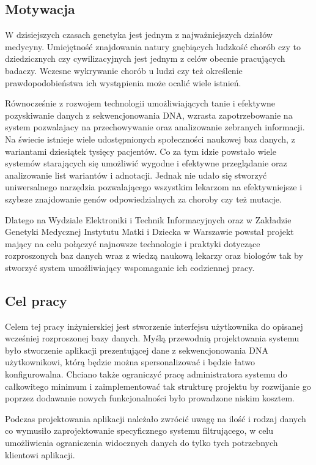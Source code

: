 \documentclass[a4paper,12pt,twoside]{article}
\begin{document}
\subsection{Motywacja}
W dzisiejszych czasach genetyka jest jednym z najważniejszych działów medycyny.
Umiejętność znajdowania natury gnębiących ludzkość chorób
czy to dziedzicznych czy cywilizacyjnych jest jednym z celów obecnie pracujących badaczy. Wczesne wykrywanie chorób u ludzi czy też określenie prawdopodobieństwa 
ich wystąpienia może ocalić wiele istnień. 

Równocześnie z rozwojem technologii umożliwiających tanie i efektywne
pozyskiwanie danych z sekwencjonowania DNA, wzrasta zapotrzebowanie 
na system pozwalajacy na przechowywanie oraz analizowanie zebranych
informacji.
Na świecie istnieje wiele udostępnionych społeczności naukowej baz danych,
z wariantami dziesiątek tysięcy pacjentów. Co za tym idzie powstało 
wiele systemów starających się umożliwić wygodne i efektywne 
przeglądanie oraz analizowanie list wariantów i adnotacji.
Jednak nie udało się stworzyć uniwersalnego narzędzia pozwalającego
wszystkim lekarzom na efektywniejsze i szybsze znajdowanie
genów odpowiedzialnych za choroby czy też mutacje.

Dlatego na Wydziale Elektroniki i Technik Informacyjnych 
oraz w Zakładzie Genetyki Medycznej Instytutu Matki i Dziecka w Warszawie
powstał projekt mający na celu połączyć najnowsze technologie i 
praktyki dotyczące rozproszonych baz danych wraz z wiedzą naukową
lekarzy oraz biologów tak by stworzyć system umożliwiający 
wspomaganie ich codziennej pracy.
  
\subsection{Cel pracy} 
Celem tej pracy inżynierskiej jest stworzenie 
interfejsu użytkownika do opisanej wcześniej 
rozproszonej bazy danych.
Myślą przewodnią projektowania systemu było stworzenie aplikacji 
prezentującej dane z sekwencjonowania DNA użytkownikowi, którą będzie 
można spersonalizować i będzie łatwo konfigurowalna.
Chciano także ograniczyć pracę administratora systemu do
całkowitego minimum i zaimplementować tak strukturę projektu
by rozwijanie go poprzez dodawanie nowych funkcjonalności było
prowadzone niskim kosztem.

Podczas projektowania aplikacji należało zwrócić uwagę na
ilość i rodzaj danych co wymusiło zaprojektowanie specyficznego systemu
filtrującego, w celu umożliwienia ograniczenia widocznych danych
do tylko tych potrzebnych klientowi aplikacji.
\end{document}
